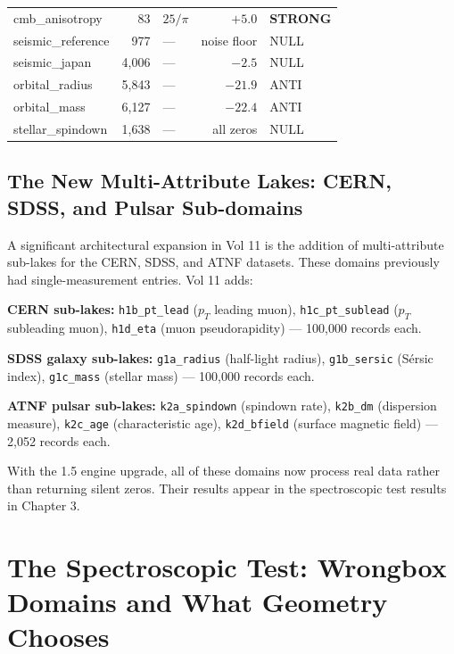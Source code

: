 \documentclass[11pt, letterpaper, openany]{book}
\begin{document}
\begin{longtable}{|l|r|l|r|l|}
\rowcolor{kishblue!3}
cmb\_anisotropy             & 83        & $25/\pi$ & $+5.0$   & \textbf{STRONG} \\
\rowcolor{gray!5}
seismic\_reference          & 977       & ---      & noise floor & NULL \\
\rowcolor{gray!4}
seismic\_japan              & 4,006     & ---      & $-2.5$   & NULL \\
\rowcolor{gray!3}
orbital\_radius             & 5,843     & ---      & $-21.9$  & ANTI \\
\rowcolor{gray!3}
orbital\_mass               & 6,127     & ---      & $-22.4$  & ANTI \\
\rowcolor{gray!3}
stellar\_spindown           & 1,638     & ---      & all zeros & NULL \\
\hline
\end{longtable}

\section{The New Multi-Attribute Lakes: CERN, SDSS, and Pulsar Sub-domains}

A significant architectural expansion in Vol 11 is the addition of
multi-attribute sub-lakes for the CERN, SDSS, and ATNF datasets. These domains
previously had single-measurement entries. Vol 11 adds:

\textbf{CERN sub-lakes:} \texttt{h1b\_pt\_lead} ($p_T$ leading muon),
\texttt{h1c\_pt\_sublead} ($p_T$ subleading muon), \texttt{h1d\_eta}
(muon pseudorapidity) --- 100,000 records each.

\textbf{SDSS galaxy sub-lakes:} \texttt{g1a\_radius} (half-light radius),
\texttt{g1b\_sersic} (S\'ersic index), \texttt{g1c\_mass} (stellar mass)
--- 100,000 records each.

\textbf{ATNF pulsar sub-lakes:} \texttt{k2a\_spindown} (spindown rate),
\texttt{k2b\_dm} (dispersion measure), \texttt{k2c\_age} (characteristic age),
\texttt{k2d\_bfield} (surface magnetic field) --- 2,052 records each.

With the 1.5 engine upgrade, all of these domains now process real data rather
than returning silent zeros. Their results appear in the spectroscopic test
results in Chapter 3.

\clearpage

\chapter{The Spectroscopic Test: Wrongbox Domains and What Geometry Chooses}
\end{document}
